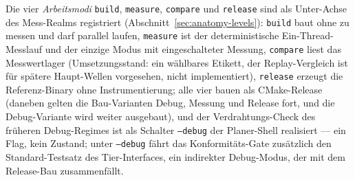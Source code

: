 \begin{nurkurz}
Die vier \emph{Arbeitsmodi} \texttt{build}, \texttt{measure}, \texttt{compare} und \texttt{release} sind
als Unter-Achse des Mess-Realms registriert (Abschnitt~\ref{sec:anatomy-levels}): \texttt{build} baut ohne
zu messen und darf parallel laufen, \texttt{measure} ist der deterministische Ein-Thread-Messlauf und der
einzige Modus mit eingeschalteter Messung, \texttt{compare} liest das Messwertlager (Umsetzungsstand: ein
wählbares Etikett, der Replay-Vergleich ist für spätere Haupt-Wellen vorgesehen, nicht implementiert),
\texttt{release} erzeugt die Referenz-Binary ohne Instrumentierung; alle vier bauen als CMake-Release (daneben
gelten die Bau-Varianten Debug, Messung und Release fort, und die Debug-Variante wird weiter ausgebaut), und
der Verdrahtungs-Check des
früheren Debug-Regimes ist als Schalter \texttt{--debug} der Planer-Shell realisiert --- ein Flag, kein
Zustand; unter \texttt{--debug} fährt das Konformitäts-Gate zusätzlich den Standard-Testsatz des Tier-Interfaces, ein indirekter
Debug-Modus, der mit dem Release-Bau zusammenfällt.
\end{nurkurz}

